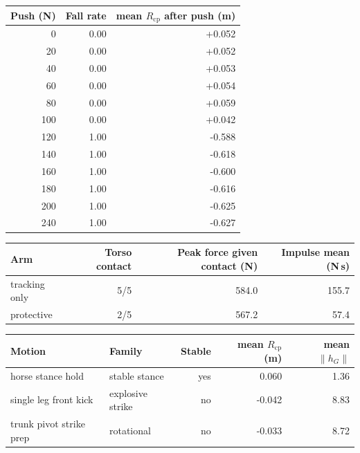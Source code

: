 \begin{tabular}{rrr} \toprule
Push (N) & Fall rate & mean $R_\mathrm{cp}$ after push (m) \\ \midrule
0 & 0.00 & +0.052 \\
20 & 0.00 & +0.052 \\
40 & 0.00 & +0.053 \\
60 & 0.00 & +0.054 \\
80 & 0.00 & +0.059 \\
100 & 0.00 & +0.042 \\
120 & 1.00 & -0.588 \\
140 & 1.00 & -0.618 \\
160 & 1.00 & -0.600 \\
180 & 1.00 & -0.616 \\
200 & 1.00 & -0.625 \\
240 & 1.00 & -0.627 \\
\bottomrule \end{tabular}

\begin{tabular}{lrrr} \toprule
Arm & Torso contact & Peak force given contact (N) & Impulse mean (N\,s) \\ \midrule
tracking only & 5/5 & 584.0 & 155.7 \\
protective & 2/5 & 567.2 & 57.4 \\
\bottomrule \end{tabular}

\begin{tabular}{llrrr} \toprule
Motion & Family & Stable & mean $R_\mathrm{cp}$ (m) & mean $\|h_G\|$ \\ \midrule
horse stance hold & stable stance & yes & 0.060 & 1.36 \\
single leg front kick & explosive strike & no & -0.042 & 8.83 \\
trunk pivot strike prep & rotational & no & -0.033 & 8.72 \\
\bottomrule \end{tabular}